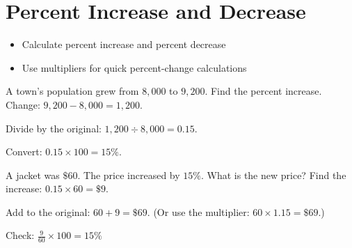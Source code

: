 \section{Percent Increase and Decrease}

\begin{stepGoal}
\begin{itemize}
    \item Calculate percent increase and percent decrease
    \item Use multipliers for quick percent-change calculations
\end{itemize}
\end{stepGoal}

\begin{stepVocabBox}
\end{stepVocabBox}

\begin{stepsCard}
\end{stepsCard}

\begin{stepExample}{A town's population grew from $8{,}000$ to $9{,}200$. Find the percent increase.}
     Change: $9{,}200 - 8{,}000 = 1{,}200$.

     Divide by the original: $1{,}200 \div 8{,}000 = 0.15$.

     Convert: $0.15 \times 100 = 15\%$.
\end{stepExample}

\begin{stepExample}{A jacket was $\$60$. The price increased by $15\%$. What is the new price?}
     Find the increase: $0.15 \times 60 = \$9$.

     Add to the original: $60 + 9 = \$69$. (Or use the multiplier: $60 \times 1.15 = \$69$.)

     Check: $\frac{9}{60} \times 100 = 15\%$ \checkmark
\end{stepExample}

